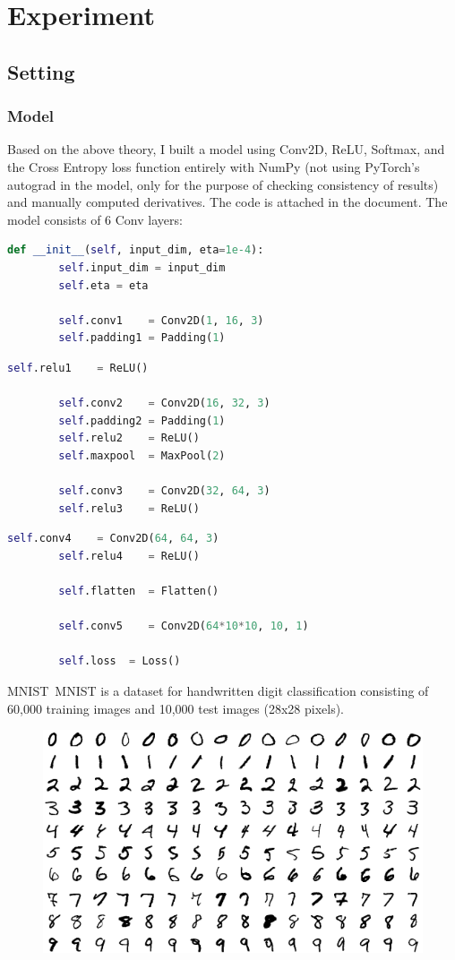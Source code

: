 \documentclass{beamer}
\begin{document}
    \section{Experiment}
    \subsection{Setting}
    
    \begin{frame}[fragile]
    	\frametitle{Model}
    	\justifying
    	Based on the above theory, I built a model using Conv2D, ReLU, Softmax, and the Cross Entropy loss function entirely with NumPy (not using PyTorch's autograd in the model, only for the purpose of checking consistency of results) and manually computed derivatives. The code is attached in the document. The model consists of 6 Conv layers:
\begin{multicols}{2}
	\small
	\begin{lstlisting}[language=Python]
		def __init__(self, input_dim, eta=1e-4):
		self.input_dim = input_dim
		self.eta = eta
		
		self.conv1    = Conv2D(1, 16, 3)
		self.padding1 = Padding(1)
	\end{lstlisting}
	\begin{lstlisting}[language=Python]
		self.relu1    = ReLU()
		
		self.conv2    = Conv2D(16, 32, 3)
		self.padding2 = Padding(1)
		self.relu2    = ReLU()
		self.maxpool  = MaxPool(2)
		
		self.conv3    = Conv2D(32, 64, 3)
		self.relu3    = ReLU()
	\end{lstlisting}
	\begin{lstlisting}[language=Python]
		self.conv4    = Conv2D(64, 64, 3)
		self.relu4    = ReLU()
		
		self.flatten  = Flatten()
		
		self.conv5    = Conv2D(64*10*10, 10, 1)
		
		self.loss  = Loss()
	\end{lstlisting}
\end{multicols}
    \end{frame}
    
        \begin{frame}{MNIST}{\thesection \, \secname}
    	MNIST is a dataset for handwritten digit classification consisting of 60,000 training images and 10,000 test images (28x28 pixels).
    	
    	\begin{figure}
    		\centering
    		\includegraphics[width=0.6\linewidth]{src/MnistExamplesModified}
    	\end{figure}
    \end{frame}
    
\end{document}
